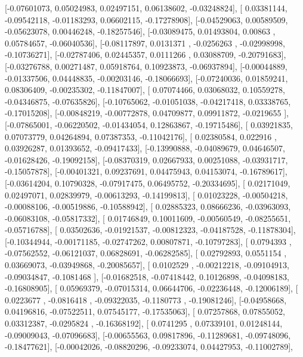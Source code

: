 \documentclass{article}
\begin{document}
       [-0.07601073,  0.05024983,  0.02497151,  0.06138602, -0.03248824],
       [ 0.03381144, -0.09542118, -0.01183293,  0.06602115, -0.17278908],
       [-0.04529063,  0.00589509, -0.05623078,  0.00446248, -0.18257546],
       [-0.03089475,  0.01493804,  0.00863   ,  0.05784657, -0.06040536],
       [-0.08117897,  0.0131371 , -0.0256263 , -0.02998998, -0.10736271],
       [-0.02787406,  0.02445357,  0.0111266 ,  0.03088709, -0.20791683],
       [-0.03276788,  0.00271487,  0.05918764,  0.10923873, -0.06937894],
       [-0.00044889, -0.01337506,  0.04448835, -0.00203146, -0.18066693],
       [-0.07240036,  0.01859241,  0.08306409, -0.00235302, -0.11847007],
       [ 0.07074466,  0.03068032,  0.10559278, -0.04346875, -0.07635826],
       [-0.10765062, -0.01051038, -0.04217418,  0.03338765, -0.17015208],
       [-0.00848219, -0.00772878,  0.04709877,  0.09911872, -0.0219655 ],
       [-0.07865001, -0.06220502, -0.01434054,  0.12863867, -0.19715486],
       [ 0.03921835,  0.07073779,  0.04264894,  0.07387353, -0.11042176],
       [ 0.02380584,  0.022916  ,  0.03926287,  0.01393652, -0.09417433],
       [-0.13990888, -0.04089679,  0.04646507, -0.01628426, -0.19092158],
       [-0.08370319,  0.02667933,  0.00251088, -0.03931717, -0.15057878],
       [-0.00401321,  0.09237691,  0.04475943,  0.04153074, -0.16789617],
       [-0.03614204,  0.10790328, -0.07917475,  0.06495752, -0.20334695],
       [ 0.02171049,  0.02497071,  0.02839979, -0.00613293, -0.14199813],
       [ 0.01023228, -0.00504218, -0.00088106, -0.00519886, -0.10588942],
       [ 0.02885323,  0.08666236, -0.03963093, -0.06083108, -0.05817332],
       [ 0.01746849,  0.10011609, -0.00560549, -0.08255651, -0.05716788],
       [ 0.03502636, -0.01921537, -0.00812323, -0.04187528, -0.11878304],
       [-0.10344944, -0.00171185, -0.02747262,  0.00807871, -0.10797283],
       [ 0.0794393 , -0.07562552, -0.06121037,  0.06828691, -0.06282585],
       [ 0.02792893,  0.0551154 ,  0.03669073, -0.03949868, -0.20085657],
       [ 0.0102529 , -0.00212218, -0.09104913, -0.09034847, -0.1081468 ],
       [-0.01682518, -0.07418442,  0.10126898, -0.04098183, -0.16808905],
       [ 0.05969379, -0.07015314,  0.06644706, -0.02236448, -0.12006189],
       [ 0.0223677 , -0.0816418 , -0.09322035, -0.1180773 , -0.19081246],
       [-0.04958668,  0.04196816, -0.07522511,  0.07545177, -0.17535063],
       [ 0.07257868,  0.07855052,  0.03312387, -0.0295824 , -0.16368192],
       [ 0.0741295 ,  0.07339101,  0.01248144, -0.09009043, -0.07096683],
       [-0.00655563,  0.09817896, -0.11289681, -0.09748096, -0.18477621],
       [-0.00042026, -0.08820296, -0.09233074,  0.04427953, -0.11002789],
\end{document}
